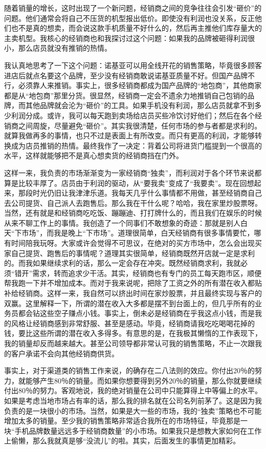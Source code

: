 随着销量的增长，这时出现了一个新问题，经销商之间的竞争往往会引发“砸价”的问题。他们通常会将自己不压货的机型报出低价。即使没有利润也没关系，反正他们也不是真的想卖，而会说这款手机质量不好什么的，然后再主推他们库存量大的主卖机型。我核心的经销商也和我探讨过这个问题：如果我的品牌被砸得利润很小，那么店员就没有推销的热情。

我认真地思考了一下这个问题：诺基亚可以用全线开花的销售策略，毕竟很多顾客进店后就点名要这个品牌，至少没有经销商敢说诺基亚质量不好。但国产品牌不行，必须靠人来推销。事实上，很多经销商都成为国产品牌的“地包商”，其他商家都是从“地包商”那里分货。很显然，经销商一定会不遗余力地推销自己包销的品牌，而其他品牌就会沦为“砸价”的工具。如果手机没有利润，那么店员就拿不到多少利润分成。或许，我可以每天跑到卖场给店员买些冷饮讨好他们；然后在各个经销商之间周旋，尽量避免“砸价”。其实我很清楚，任何市场的参与者都是求利的。就算我做再多的事情，也只不过是表面上有所改变。而只有更高的利润，才能够转换成为店员推销的热情。最终我作了一决定：背着公司将进货门槛提到一个很高的水平，这样就能够把不是真心想卖货的经销商挡在门外。

这样一来，我负责的市场渐渐变为一家经销商“独卖”，而利润对于各个环节来说都算是比较丰厚了。店员由于利润的驱动，从“要我卖”变成了“我要卖”。现在回想起来，那段时光仍旧让我津津乐道。我每天几乎什么事情都不用做，甚至经销商自己去公司提货、自己派人去跑售后。那么我在干什么呢？哈哈，我在家里炒股票呀。当然，还有就是和经销商吃吃饭、蹦蹦迪、打打牌什么的，而且我们在娱乐的时候从来不聊工作上的事情。我创造了一个同事们不敢想象的奇迹：那就是别人白天“下市场”，而我是晚上“下市场”。道理很简单，白天经销商有很多事情要忙，哪有时间陪我玩呀。大家或许会觉得不可思议，在绝对的买方市场中，怎么会出现买家自己提货、跑售后的事情呢？道理其实很简单，经销商既然开店就一定是求利的。而我如果继续求利的话，那么一定会存在冲突。既然经销商求利，我就必须“错开”需求，转而追求少干活。其实，经销商也有专门的员工每天跑市区，顺便帮我跑一下并不增加成本。而对于我来说呢，把除了工资之外的所有潜在收入都贴补给经销商。这样一来，我自然可以挤出时间在家炒股票，并且最终实现与客户的双赢。这里解释一下，所谓的潜在收入大多都是摆不到台面上的，但几乎所有的业务员都会钻这些空子赚点小钱。事实上，倒未必是经销商在乎我这点小钱，而是我的风格让经销商感到非常舒服、甚至是感动。毕竟，经销商请我吃吃喝喝花掉的钱，要比这些所谓的潜在收入多得多。有意思的是，在我极其懒惰的工作表现下，我的销量却反而越来越大。甚至公司领导都非常认可我的销售策略，不止一次跟我的客户承诺不会向其他经销商供货。

事实上，对于渠道类的销售工作来说，的确存在二八法则的效应。你付出20％的努力，就能够产生80％的销量。而如果你想要得到另外20％的销量，那么你就要继续付出80％的努力。客观地说，我的绝对销量在公司中只能算得上中等偏上的水平。如果是考虑当地市场占有率的话，那么我的排名就在公司名列前茅了。这是因为我负责的是一块很小的市场。当然，如果是大一些的市场，我的“独卖”策略也不可能增加太多的销量。至少我的销售策略非常适合我所在的市场特征，毕竟那是一块“手机品牌数量远远多于经销商数量”的小市场。如果我只是想教大家如何在工作上偷懒，那么我就真是够“没流儿”的啦。其实，后面发生的事情更加精彩。

